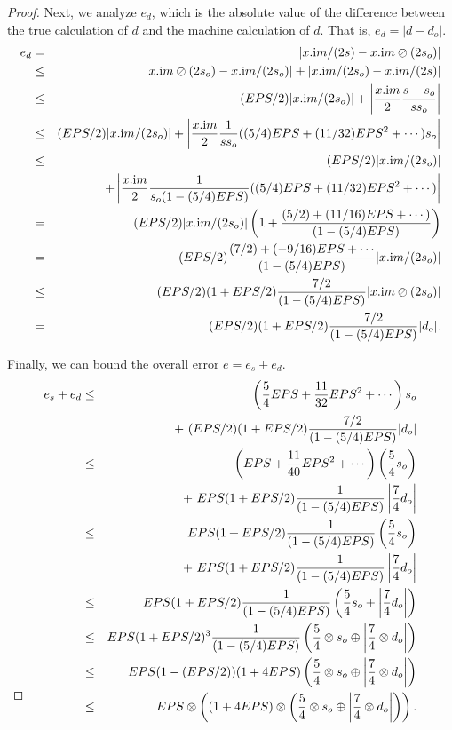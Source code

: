 \begin{proof}{}
Next, we analyze $e_d$, which is the absolute value of the difference between the true calculation of $d$ and the machine calculation of $d$.  That is, $e_d = |d - d_o|.$
\begin{eqnarray*}
e_d &=& |x.{\mathrm im}/(2s) - x.{\mathrm im} \oslash (2 s_o)|\\
&\le& |x.{\mathrm im} \oslash (2 s_o) - x.{\mathrm im} / (2 s_o)| + 
|x.{\mathrm im}/(2s_o) - x.{\mathrm im}/(2s) |\\
&\le& (EPS/2) |x.{\mathrm im} / (2 s_o)| + \left|{x.{\mathrm im} \over 2} {s - s_o \over s s_o} \right|\\
&\le& (EPS/2) |x .{\mathrm im}/ (2
s_o)| +\left|{x.{\mathrm im} \over 2} {1 \over s s_o} ((5/4)EPS + (11/32)EPS^2+\cdots) s_o\right|\\
&\le& (EPS/2) |x.{\mathrm im} / (2
s_o)| \\
&&+ \left|{x.{\mathrm im} \over 2} {1 \over s_o (1 - (5/4)EPS)}((5/4)EPS + (11/32)EPS^2+\cdots)\right|\\
&= &(EPS/2) |x .{\mathrm
im}/ (2 s_o)| \left(1 + {(5/2) + (11/16)EPS+\cdots) \over (1 - (5/4)EPS)}\right)\\
&= &(EPS/2) {(7/2) + (-9/16) EPS +\cdots\over
(1 - (5/4)EPS)} |x .{\mathrm im}/ (2 s_o)|\\
&\le& (EPS/2) (1+EPS/2)
 {7/2 \over (1 - (5/4)EPS)}
|x .{\mathrm im} \oslash (2 s_o)|\\
&= &(EPS/2) (1+EPS/2)
 {7/2 \over (1 - (5/4)EPS)}
|d_o|.
\end{eqnarray*}
 
Finally, we can bound the overall error $e = e_s + e_d$.
\begin{eqnarray*}
e_s + e_d&\le& \left({5 \over 4} EPS + {11 \over 32} EPS^2 +\cdots\right) s_o\\
&& +\
 (EPS/2) (1+EPS/2)
 {7/2 \over (1 - (5/4)EPS)}|d_o|\\
&\le& \left( EPS + {11 \over 40} EPS^2 +\cdots\right) \left({5 \over 4} s_o\right) \\
&&+\
 EPS (1+EPS/2)
 {1 \over (1 - (5/4)EPS)}\left|{7 \over 4} d_o\right|\\
&\le& EPS (1+EPS/2)
 {1 \over (1 - (5/4)EPS)} \left({5 \over 4} s_o\right) \\
&&+
\  EPS (1+EPS/2)
 {1 \over (1 - (5/4)EPS)}\left|{7 \over 4} d_o\right|\\
&\le& EPS (1+EPS/2)
 {1 \over (1 - (5/4)EPS)}
\left({5 \over 4} s_o +\left|{7 \over 4} d_o\right|\right)\\
&\le& EPS (1+EPS/2)^3
 {1 \over (1 - (5/4)EPS)}
\left({5 \over 4} \otimes s_o \oplus \left|{7 \over 4} \otimes d_o\right|\right)\\
&\le& EPS (1 - (EPS/2))(1 + 4 EPS) 
\left({5 \over 4} \otimes s_o \oplus \left|{7 \over 4} \otimes d_o\right|\right)\\
&\le& EPS \otimes \left((1 + 4 EPS) \otimes
\left({5 \over 4} \otimes s_o \oplus \left|{7 \over 4} \otimes d_o\right|\right)\right).\\
\noalign{\vskip-36pt}
\end{eqnarray*}
\end{proof}
 
